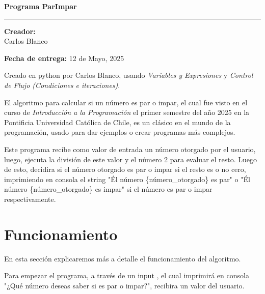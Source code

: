 \documentclass{article}
\begin{document}
\begin{center}
    {\Huge \textbf{Programa ParImpar} \par}
    \rule{80mm}{0.1mm}

    {\large \textbf{Creador:}\\\normalsize Carlos Blanco \par} 
    \medskip
    \textbf{Fecha de entrega:} 12 de Mayo, 2025
    \vspace{10pt}

\end{center}

\noindent Creado en python por Carlos Blanco, usando \textit{Variables y Expresiones} y \textit{Control de Flujo (Condiciones e iteraciones)}.

\vspace{10pt}

\noindent El algoritmo para calcular si un número es par o impar, el cual fue visto en el curso de \textit{Introducción a la Programación} el primer semestre del año 2025 en la Pontificia Universidad Católica de Chile, es un clásico en el mundo de la programación, usado para dar ejemplos o crear programas más complejos.

\vspace{10pt}

 \noindent Este programa recibe como valor de entrada un número  otorgado por el usuario, luego, ejecuta la división de este valor y el número 2 para evaluar el resto. Luego de esto, decidira si el número otorgado es par o impar si el resto es o no cero, imprimiendo en consola el string "Él número \{número\_otorgado\} es par" o "Él número \{número\_otorgado\} es impar" si el número es par o impar respectivamente.

\vspace{10pt}

\section*{Funcionamiento}

\noindent En esta sección explicaremos más a detalle el funcionamiento del algoritmo.

\vspace{10pt}

\noindent Para empezar el programa, a través de un input , el cual imprimirá en consola "¿Qué número deseas saber si es par o impar?", recibira un valor del usuario.

\vspace{10pt}
\end{document}
